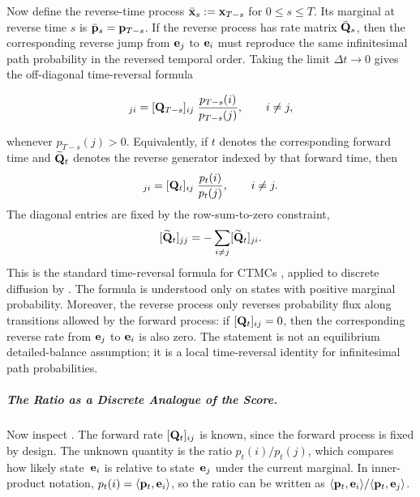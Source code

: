 Now define the reverse-time process $\bar{{\mathbf{x}}}_s := {\mathbf{x}}_{T-s}$ for $0\leq s\leq T$. Its marginal at reverse time $s$ is $\bar{{\mathbf{p}}}_s={\mathbf{p}}_{T-s}$. If the reverse process has rate matrix $\bar{{\mathbf{Q}}}_s$, then the corresponding reverse jump from ${\mathbf{e}}_j$ to ${\mathbf{e}}_i$ must reproduce the same infinitesimal path probability in the reversed temporal order. Taking the limit $\Delta t\to 0$ gives the off-diagonal time-reversal formula
\begin{mdframed}
\begin{equation}
[\bar{\rmQ}_s]_{ji}
= [\rmQ_{T-s}]_{ij}\;\frac{p_{T-s}(i)}{p_{T-s}(j)},
\qquad i \neq j,
\label{eq:reverse-rate-discrete-reverse-time}
\end{equation}
\end{mdframed}
whenever $p_{T-s}(j)>0$. Equivalently, if $t$ denotes the corresponding forward time and $\widetilde{{\mathbf{Q}}}_t$ denotes the reverse generator indexed by that forward time, then
\begin{equation}
[\widetilde{\rmQ}_t]_{ji}
= [\rmQ_t]_{ij}\;\frac{p_t(i)}{p_t(j)},
\qquad i \neq j.
\label{eq:reverse-rate-discrete}
\end{equation}
The diagonal entries are fixed by the row-sum-to-zero constraint,
\[
[\widetilde{{\mathbf{Q}}}_t]_{jj}
=
-\sum_{i\neq j}[\widetilde{{\mathbf{Q}}}_t]_{ji}.
\]
This is the standard time-reversal formula for CTMCs
\citep{kelly1979reversibility,anderson2012continuous}, applied to
discrete diffusion by \citet{campbell2022continuous}. The formula is understood only on states with positive marginal probability. Moreover, the
reverse process only reverses probability flux along transitions allowed by the
forward process: if $[{\mathbf{Q}}_t]_{ij}=0$, then the corresponding reverse rate from
${\mathbf{e}}_j$ to ${\mathbf{e}}_i$ is also zero. The statement is not an equilibrium detailed-balance assumption; it is a local time-reversal identity for infinitesimal path probabilities.

\subparagraph{The Ratio as a Discrete Analogue of the Score.}
Now inspect .  The forward rate
$[{\mathbf{Q}}_t]_{ij}$ is known, since the forward process is fixed by design.
The unknown quantity is the ratio $p_t(i)/p_t(j)$,
which compares how likely state~${\mathbf{e}}_i$ is relative to
state~${\mathbf{e}}_j$ under the current marginal.  In inner-product notation,
$p_t(i) = \langle{\mathbf{p}}_t,{\mathbf{e}}_i\rangle$, so the ratio can be written as
$\langle{\mathbf{p}}_t,{\mathbf{e}}_i\rangle / \langle{\mathbf{p}}_t,{\mathbf{e}}_j\rangle$.

